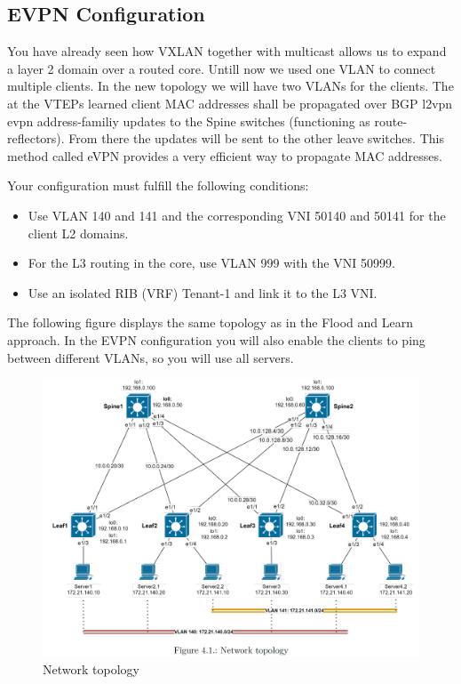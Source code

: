 \documentclass[11pt,titlepage]{article}
\newenvironment{shadedquotation}
 {\begin{shaded*}
  \quoting[leftmargin=0pt, vskip=0pt]
 }
 {\endquoting
 \end{shaded*}
}
\begin{document}
\subsection{EVPN Configuration}
You have already seen how VXLAN together with multicast allows us to expand a layer 2 domain over a routed core. Untill now we used one VLAN to connect multiple clients. In the new topology we will have two VLANs for the clients. The at the VTEPs learned client MAC addresses shall be propagated over BGP l2vpn evpn address-familiy updates to the Spine switches (functioning as route-reflectors). From there the updates will be sent to the other leave switches. This method called eVPN provides a very efficient way to propagate MAC addresses.
\begin{shadedquotation}
	Your configuration must fulfill the following conditions:
	\begin{itemize}
		\item Use VLAN 140 and 141 and the corresponding VNI 50140 and 50141 for the client L2
		domains.
		\item For the L3 routing in the core, use VLAN 999 with the VNI 50999.
		\item Use an isolated RIB (VRF) Tenant-1 and link it to the L3 VNI.
	\end{itemize}
\end{shadedquotation}
The following figure displays the same topology as in the Flood and Learn approach. In the EVPN configuration you will also enable the clients to ping between different VLANs, so you will use all servers.
\begin{figure}[H]
	\centering
	\includegraphics[width=0.9\linewidth]{"images/topology eVPN"}
	\caption{Network topology}
	\label{fig:topology-evpn}
\end{figure}
\end{document}
